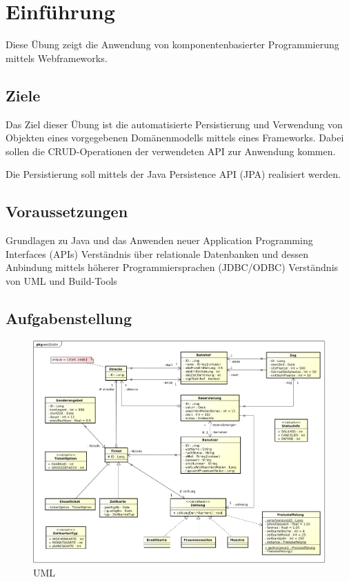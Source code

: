 \section{Einführung}
Diese Übung zeigt die Anwendung von komponentenbasierter Programmierung mittels Webframeworks.

\subsection{Ziele}

Das Ziel dieser Übung ist die automatisierte Persistierung und Verwendung von Objekten eines vorgegebenen Domänenmodells mittels eines Frameworks. Dabei sollen die CRUD-Operationen der verwendeten API zur Anwendung kommen.

Die Persistierung soll mittels der Java Persistence API (JPA) realisiert werden.

\subsection{Voraussetzungen}

Grundlagen zu Java und das Anwenden neuer Application Programming Interfaces (APIs)
Verständnis über relationale Datenbanken und dessen Anbindung mittels höherer Programmiersprachen (JDBC/ODBC)
Verständnis von UML und Build-Tools


\subsection{Aufgabenstellung}

\begin{figure}
	\centering
	\includegraphics[width=1\linewidth]{images/uml}
	\caption{UML}
	\label{fig:uml}
\end{figure}

